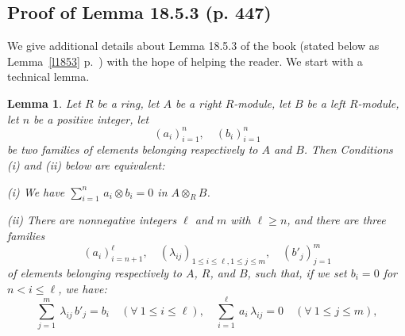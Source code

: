 \documentclass[12pt]{article}%
\newtheorem{lem}[thm]{Lemma}
\theoremstyle{remark}
\theoremstyle{definition}
\newcommand{\nn}{\noindent}
\begin{document}

\subsection{Proof of Lemma 18.5.3 (p. 447)} 

We give additional details about Lemma 18.5.3 of the book (stated below as Lemma~\ref{l1853} p.~\pageref{l1853}) with the hope of helping the reader. We start with a technical lemma.

\begin{lem}\label{techlem}
Let $R$ be a ring, let $A$ be a right $R$-module, let $B$ be a left $R$-module, let $n$ be a positive integer, let 
$$
(a_i)_{i=1}^n,\quad(b_i)_{i=1}^n
$$
be two families of elements belonging respectively to $A$ and $B$. Then Conditions \emph{(i)} and \emph{(ii)} below are equivalent:

\nn\emph{(i)} We have $\sum_{i=1}^n\,a_i\otimes b_i=0$ in $A\otimes_RB$. 

\nn\emph{(ii)} There are nonnegative integers $\ell$ and $m$ with $\ell\ge n$, and there are three families 
$$
(a_i)_{i=n+1}^\ell,\quad(\lambda_{ij})_{1\le i\le\ell,1\le j\le m},\quad(b'_j)_{j=1}^m
$$ 
of elements belonging respectively to $A$, $R$, and $B$, such that, if we set $b_i=0$ for $n<i\le\ell$, we have:
\begin{equation}\label{lij}
\sum_{j=1}^m\ \lambda_{ij}\,b'_j=b_i\quad(\forall\ 1\le i\le\ell),\quad
\sum_{i=1}^\ell\ a_i\,\lambda_{ij}=0\quad(\forall\ 1\le j\le m),
\end{equation}
\end{lem} 
\end{document}

